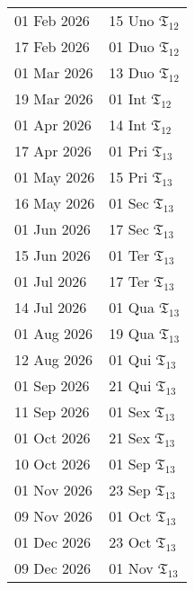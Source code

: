 \begin{table}
\begin{tabular}{|l|l|}
        01 Feb 2026 & 15 Uno $\mathfrak{T}_{12}$ \\
        17 Feb 2026 & 01 Duo $\mathfrak{T}_{12}$ \\
        01 Mar 2026 & 13 Duo $\mathfrak{T}_{12}$ \\
        19 Mar 2026 & 01 Int $\mathfrak{T}_{12}$ \\
        01 Apr 2026 & 14 Int $\mathfrak{T}_{12}$ \\
        17 Apr 2026 & 01 Pri $\mathfrak{T}_{13}$ \\
        01 May 2026 & 15 Pri $\mathfrak{T}_{13}$ \\
        16 May 2026 & 01 Sec $\mathfrak{T}_{13}$ \\
        01 Jun 2026 & 17 Sec $\mathfrak{T}_{13}$ \\
        15 Jun 2026 & 01 Ter $\mathfrak{T}_{13}$ \\
        01 Jul 2026 & 17 Ter $\mathfrak{T}_{13}$ \\
        14 Jul 2026 & 01 Qua $\mathfrak{T}_{13}$ \\
        01 Aug 2026 & 19 Qua $\mathfrak{T}_{13}$ \\
        12 Aug 2026 & 01 Qui $\mathfrak{T}_{13}$ \\
        01 Sep 2026 & 21 Qui $\mathfrak{T}_{13}$ \\
        11 Sep 2026 & 01 Sex $\mathfrak{T}_{13}$ \\
        01 Oct 2026 & 21 Sex $\mathfrak{T}_{13}$ \\
        10 Oct 2026 & 01 Sep $\mathfrak{T}_{13}$ \\
        01 Nov 2026 & 23 Sep $\mathfrak{T}_{13}$ \\
        09 Nov 2026 & 01 Oct $\mathfrak{T}_{13}$ \\
        01 Dec 2026 & 23 Oct $\mathfrak{T}_{13}$ \\
        09 Dec 2026 & 01 Nov $\mathfrak{T}_{13}$ \\
        \hline
    \end{tabular}
\end{table}

